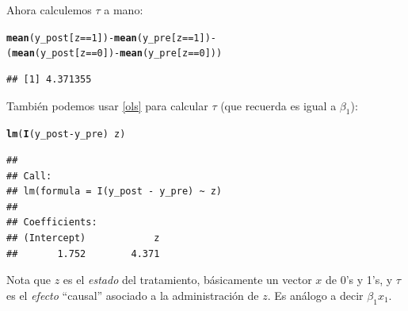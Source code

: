 \documentclass[onesided]{article}\usepackage[]{graphicx}\usepackage[]{color}
\makeatletter
\newcommand{\hlnum}[1]{\textcolor[rgb]{0.686,0.059,0.569}{#1}}%
\newcommand{\hlopt}[1]{\textcolor[rgb]{0,0,0}{#1}}%
\newcommand{\hlstd}[1]{\textcolor[rgb]{0.345,0.345,0.345}{#1}}%
\newcommand{\hlkwd}[1]{\textcolor[rgb]{0.737,0.353,0.396}{\textbf{#1}}}%
\newenvironment{kframe}{%
 \def\at@end@of@kframe{}%
 \ifinner\ifhmode%
  \def\at@end@of@kframe{\end{minipage}}%
  \begin{minipage}{\columnwidth}%
 \fi\fi%
 \def\FrameCommand##1{\hskip\@totalleftmargin \hskip-\fboxsep
 \colorbox{shadecolor}{##1}\hskip-\fboxsep
     \hskip-\linewidth \hskip-\@totalleftmargin \hskip\columnwidth}%
 \MakeFramed {\advance\hsize-\width
   \@totalleftmargin\z@ \linewidth\hsize
   \@setminipage}}%
 {\par\unskip\endMakeFramed%
 \at@end@of@kframe}
\newenvironment{knitrout}{}{} %
\makeatother
\begin{document}
Ahora calculemos $\tau$ a mano:

\begin{knitrout}
\color{fgcolor}\begin{kframe}
\begin{alltt}
\hlkwd{mean}\hlstd{(y_post[z} \hlopt{==} \hlnum{1}\hlstd{])} \hlopt{-} \hlkwd{mean}\hlstd{(y_pre[z} \hlopt{==} \hlnum{1}\hlstd{])} \hlopt{-}
\hlstd{(}\hlkwd{mean}\hlstd{(y_post[z} \hlopt{==} \hlnum{0}\hlstd{])} \hlopt{-} \hlkwd{mean}\hlstd{(y_pre[z} \hlopt{==} \hlnum{0}\hlstd{]))}
\end{alltt}
\begin{verbatim}
## [1] 4.371355
\end{verbatim}
\end{kframe}
\end{knitrout}

Tambi\'en podemos usar \autoref{ols} para calcular $\tau$ (que recuerda es igual a $\beta_{1}$):

\begin{knitrout}
\color{fgcolor}\begin{kframe}
\begin{alltt}
\hlkwd{lm}\hlstd{(}\hlkwd{I}\hlstd{(y_post} \hlopt{-} \hlstd{y_pre)} \hlopt{~} \hlstd{z)}
\end{alltt}
\begin{verbatim}
## 
## Call:
## lm(formula = I(y_post - y_pre) ~ z)
## 
## Coefficients:
## (Intercept)            z  
##       1.752        4.371
\end{verbatim}
\end{kframe}
\end{knitrout}

Nota que $z$ es el \emph{estado} del tratamiento, b\'asicamente un vector $x$ de 0's y 1's, y $\tau$ es el \emph{efecto} ``causal'' asociado a la administraci\'on de $z$. Es an\'alogo a decir $\beta_{1}x_{1}$.
\end{document}
